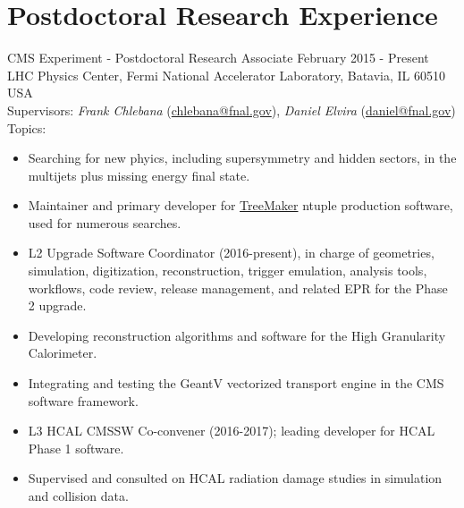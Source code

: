 \setlength{\parskip}{0pt}
\section{Postdoctoral Research Experience}
CMS Experiment - Postdoctoral Research Associate \hfill February 2015 - Present\\
LHC Physics Center, Fermi National Accelerator Laboratory, Batavia, IL 60510 USA\\
Supervisors: {\sl Frank Chlebana} (\href{mailto:chlebana@fnal.gov}{chlebana@fnal.gov}), {\sl Daniel Elvira} (\href{mailto:daniel@fnal.gov}{daniel@fnal.gov})\\
Topics:
\begin{itemize}
\item Searching for new phyics, including supersymmetry and hidden sectors, in the multijets plus missing energy final state.
\item Maintainer and primary developer for \href{https://github.com/TreeMaker/TreeMaker}{TreeMaker} ntuple production software, used for numerous searches.
\item L2 Upgrade Software Coordinator (2016-present), in charge of geometries, simulation, digitization, reconstruction, trigger emulation, analysis tools, workflows, code review, release management, and related EPR for the Phase 2 upgrade.
\item Developing reconstruction algorithms and software for the High Granularity Calorimeter.
\item Integrating and testing the GeantV vectorized transport engine in the CMS software framework.
\item L3 HCAL CMSSW Co-convener (2016-2017); leading developer for HCAL Phase 1 software.
\item Supervised and consulted on HCAL radiation damage studies in simulation and collision data.
\end{itemize}
